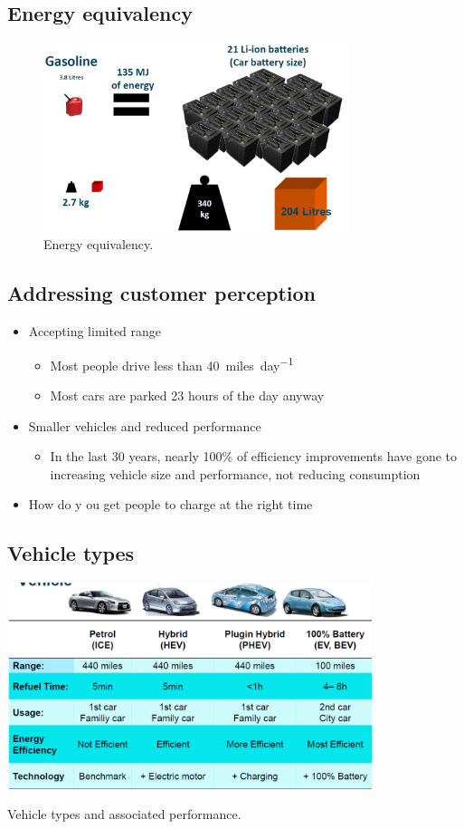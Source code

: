\subsection{Energy equivalency}
\begin{figure}[H]
    \centering
    \includegraphics[width = 0.8\textwidth]{img/figure108.png}
    \caption{Energy equivalency.}
\end{figure}
\subsection{Addressing customer perception}
\begin{itemize}
    \item Accepting limited range
          \begin{itemize}
              \item Most people drive less than \SI{40}{miles\per day}
              \item Most cars are parked 23 hours of the day anyway
          \end{itemize}
    \item Smaller vehicles and reduced performance
          \begin{itemize}
              \item In the last 30 years, nearly 100\% of efficiency improvements have gone to increasing vehicle size and performance, not reducing consumption
          \end{itemize}
    \item How do y ou get people to charge at the right time
\end{itemize}
\subsection{Vehicle types}
\begin{table}[H]
    \centering
    \includegraphics[width = 0.8\textwidth]{img/figure109.png}
    \caption{Vehicle types and associated performance.}
\end{table}
